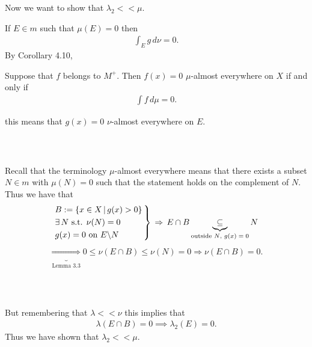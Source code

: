 \documentclass{beamer}
\newenvironment{rcases}{\left.\begin{aligned}}{\end{aligned}\right\rbrace}
\numberwithin{equation}{section}
\begin{document}
\begin{frame}\frametitle{{\normalsize \secname} \\ {\large \subsecname}}
    Now we want to show that $\lambda_2 << \mu$.
    \vspace{1em}

    If $E \in m$ such that $\mu(E) = 0$ then 
    \begin{align}
        \int_E g \, d\nu = 0.
    \end{align}
    By Corollary 4.10,
    \begingroup
    \footnotesize
    \begin{corollary}[4.10]
        Suppose that $f$ belongs to $M^+$.
        Then $f(x) = 0$ $\mu$-almost everywhere on $X$ if and only if
        \begin{align}
            \int f \, d\mu = 0.
        \end{align}
    \end{corollary}
    \endgroup
    this means that $g(x) = 0$ $\nu$-almost everywhere on $E$.
\end{frame}

\begin{frame}\frametitle{{\normalsize \secname} \\ {\large \subsecname}}
    Recall that the terminology $\mu$-almost everywhere means that there exists a subset $N \in m$ with $\mu(N) = 0$ such that the statement holds on the complement of $N$.
    Thus we have that
    \begin{align}
        \begin{rcases}
            &B := \{x \in X \,|\, g(x) > 0 \} \, \\
            &\exists \, N \text{ s.t. } \nu(N) = 0 \\
            &g(x) = 0 \text{ on } E\backslash N
        \end{rcases}
        \, \Rightarrow \, E \cap B \underbrace{\subseteq}_{\text{outside $N$, $g(x) = 0$}} N
    \end{align}
    \begin{align}
        \underbrace{\Rightarrow}_{\text{Lemma 3.3}} 0 \leq \nu(E\cap B) \leq \nu(N) = 0 \Rightarrow \nu(E \cap B) = 0.
    \end{align}
\end{frame}

\begin{frame}\frametitle{{\normalsize \secname} \\ {\large \subsecname}}
    But remembering that $\lambda << \nu$ this implies that
    \begin{align}
        \lambda(E \cap B) = 0 \implies \lambda_2(E) = 0.
    \end{align}
    Thus we have shown that $\lambda_2 << \mu$.
\end{frame}
\end{document}
